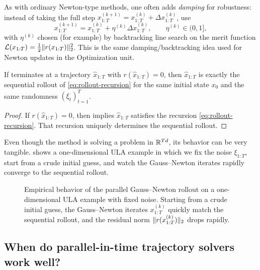 \documentclass[11pt]{article}
\begin{document}
As with ordinary Newton-type methods, one often adds \emph{damping} for robustness: instead of taking the full step
$x_{1:T}^{(k+1)}=x_{1:T}^{(k)}+\Delta x_{1:T}^{(k)}$,
use
\[
x_{1:T}^{(k+1)}=x_{1:T}^{(k)}+\eta^{(k)}\Delta x_{1:T}^{(k)},
\qquad \eta^{(k)}\in(0,1],
\]
with $\eta^{(k)}$ chosen (for example) by backtracking line search on the merit function
$\mathcal{L}(x_{1:T})=\tfrac12 \lVert r(x_{1:T})\rVert_2^2$.
This is the same damping/backtracking idea used for Newton updates in the Optimization unit.

\begin{proposition}
\label{prop:converge-correct}
If  terminates at a trajectory $\hat{x}_{1:T}$ with $r(\hat{x}_{1:T})=0$, then $\hat{x}_{1:T}$ is exactly the sequential rollout of \eqref{eq:rollout-recursion} for the same initial state $x_0$ and the same randomness $(\xi_t)_{t=1}^T$.
\end{proposition}

\begin{proof}
If $r(\hat{x}_{1:T})=0$, then  implies $\hat{x}_{1:T}$ satisfies the recursion \eqref{eq:rollout-recursion}.
That recursion uniquely determines the sequential rollout.
\end{proof}

Even though the method is solving a problem in $\mathbb{R}^{Td}$, its behavior can be very tangible.
 shows a one-dimensional ULA example in which we fix the noise $\xi_{1:T}$, start from a crude initial guess, and watch the Gauss--Newton iterates rapidly converge to the sequential rollout.

\begin{figure}[t]
  \centering
  
  \caption{Empirical behavior of the parallel Gauss--Newton rollout on a one-dimensional ULA example with fixed noise.
  Starting from a crude initial guess, the Gauss--Newton iterates $x_{1:T}^{(k)}$ quickly match the sequential rollout, and the residual norm $\lVert r(x_{1:T}^{(k)})\rVert_2$ drops rapidly.}
  \label{fig:ula-newton-convergence}
\end{figure}

\subsection{When do parallel-in-time trajectory solvers work well?}
\label{subsec:when-works}
\end{document}
